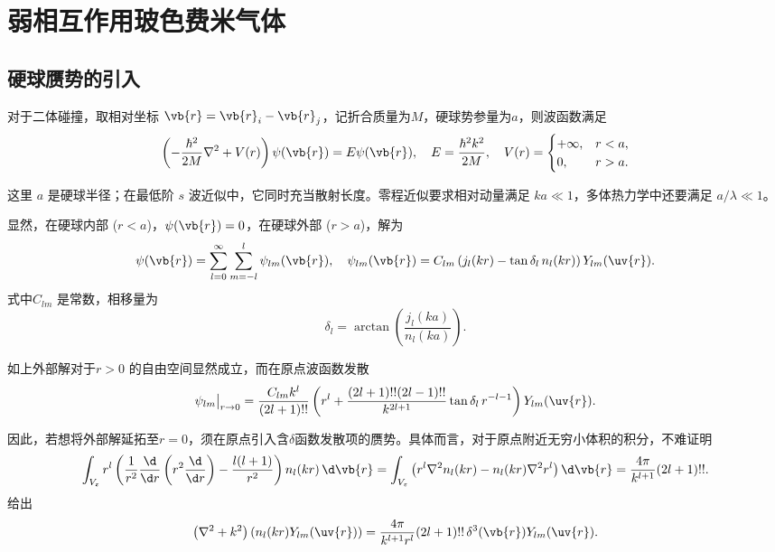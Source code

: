 
\section{弱相互作用玻色费米气体}

\subsection{硬球赝势的引入}

对于二体碰撞，取相对坐标 \(\vb{r} = \vb{r}_{i} - \vb{r}_{j}\)，记折合质量为\(M\)，硬球势参量为\(a\)，则波函数满足
\begin{equation*}
	\left( -\frac{\hbar^{2}}{2M} \nabla^{2} + V(r) \right) \psi(\vb{r}) = E \psi(\vb{r}), \quad E = \frac{\hbar^{2} k^{2}}{2M}, \quad V(r) =
	\begin{cases}
		+\infty, & r < a, \\
		0,       & r > a.
	\end{cases}
\end{equation*}

这里 \(a\) 是硬球半径；在最低阶 \(s\) 波近似中，它同时充当散射长度。零程近似要求相对动量满足 \(ka\ll1\)，多体热力学中还要满足 \(a/\lambda\ll1\)。

显然，在硬球内部 (\(r < a\))，\(\psi(\vb{r}) = 0\)，在硬球外部 (\(r > a\))，解为
\begin{equation*}
	\psi(\vb{r}) = \sum_{l=0}^{\infty} \sum_{m=-l}^{l} \psi_{lm}(\vb{r}), \quad \psi_{lm}(\vb{r}) = C_{lm} \left( j_{l}(kr) - \tan\delta_{l} \, n_{l}(kr) \right) Y_{lm}(\uv{r}).
\end{equation*}
式中\(C_{lm}\) 是常数，相移量为
\begin{equation*}
	\delta_{l} = \arctan\left( \frac{j_{l}(ka)}{n_{l}(ka)} \right).
\end{equation*}

如上外部解对于\(r > 0\) 的自由空间显然成立，而在原点波函数发散
\begin{equation*}
	\psi_{lm}\big|_{r \to 0} = \frac{C_{lm} k^{l}}{(2l+1)!!} \left( r^{l} + \frac{(2l+1)!!(2l-1)!!}{k^{2l+1}} \tan\delta_{l} \, r^{-l-1} \right) Y_{lm}(\uv{r}).
\end{equation*}

因此，若想将外部解延拓至\(r = 0\)，须在原点引入含\(\delta\)函数发散项的赝势。具体而言，对于原点附近无穷小体积的积分，不难证明
\begin{equation*}
	\int_{V_{\varepsilon}} r^{l} \left( \frac{1}{r^{2}} \frac{\d}{\d r} \left( r^{2} \frac{\d}{\d r} \right) - \frac{l(l+1)}{r^{2}} \right) n_{l}(kr) \, \d \vb{r} = \int_{V_{\varepsilon}} \left( r^{l} \nabla^{2} n_{l}(kr) - n_{l}(kr) \nabla^{2} r^{l} \right) \d \vb{r} = \frac{4\pi}{k^{l+1}} (2l+1)!!.
\end{equation*}
给出
\begin{equation*}
	\left( \nabla^{2} + k^{2} \right) \left( n_{l}(kr) Y_{lm}(\uv{r}) \right) = \frac{4\pi}{k^{l+1} r^{l}} (2l+1)!! \, \delta^3(\vb{r}) Y_{lm}(\uv{r}).
\end{equation*}

